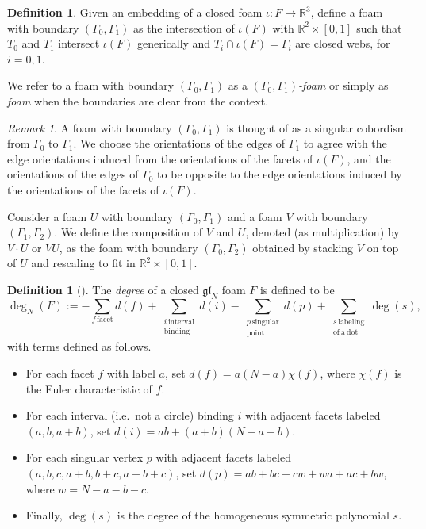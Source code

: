 \documentclass[12pt]{amsart}
\theoremstyle{definition}
\newtheorem{definition}[theorem]{Definition}
\theoremstyle{remark}
\newtheorem{remark}[theorem]{Remark}
\numberwithin{equation}{section}
\numberwithin{figure}{section}
\newcommand{\GL}{\mathfrak{gl}}
\newcommand{\foamdeg}{\deg_N}
\begin{document}
\begin{definition}\label{def:foam with closed boundary}
Given an embedding of a closed foam
$\iota : F \longrightarrow \mathbb{R}^3$, define a foam with boundary
$(\Gamma_0,\Gamma_1)$ as the intersection of $\iota(F)$ with
$\mathbb{R}^2 \times [0,1]$ such that $T_0$ and $T_1$ intersect
$\iota(F)$ generically and
$T_i \cap \iota(F)=\Gamma_i$ are closed webs, for $i=0,1$.
\end{definition}

We refer to a foam with boundary $(\Gamma_0,\Gamma_1)$ as a
\emph{$(\Gamma_0,\Gamma_1)$-foam} or simply as \emph{foam} when the boundaries are clear from the context.

\begin{remark}
A foam with boundary $(\Gamma_0,\Gamma_1)$ is thought of as a singular
cobordism from $\Gamma_0$ to $\Gamma_1$. We choose the orientations of the
edges of $\Gamma_1$ to agree with the edge orientations induced from the
orientations of the facets of $\iota(F)$, and the orientations of the edges
of $\Gamma_0$ to be opposite to the edge orientations induced by the
orientations of the facets of $\iota(F)$.

Consider a foam $U$ with boundary $(\Gamma_0,\Gamma_1)$ and a foam $V$ with
boundary $(\Gamma_1,\Gamma_2)$. We define the composition of $V$ and $U$,
denoted (as multiplication) by $V\cdot U$ or $V U$, as the foam with boundary $(\Gamma_0,\Gamma_2)$
obtained by stacking $V$ on top of $U$ and rescaling to fit in
$\mathbb{R}^2\times[0,1]$.
\end{remark}

\begin{definition}[{\cite[Definition 2.3]{RW2020}}]
\label{dfn:degreefoam}
The \emph{degree} of a closed $\GL_N$ foam $F$ is defined to be
\[
\foamdeg(F):=
-\sum_{f\,\mathrel{\mathrm{facet}}}d(f)
+\sum_{\substack{i\,\mathrel{\mathrm{interval}}\\
                   \mathrm{binding}}}d(i)
-\sum_{\substack{p\,\mathrel{\mathrm{singular}}\\
                   \mathrm{point}}}d(p)
+\sum_{\substack{s\,\mathrel{\mathrm{labeling}}\\
                   \mathrm{of\ a\ dot}}}\deg(s),
\]
with terms defined as follows.
\begin{itemize}
    \item For each facet $f$ with label $a$, set
    $d(f)=a(N-a)\chi(f)$, where $\chi(f)$ is the Euler characteristic of
    $f$.
    \item For each interval (i.e.\ not a circle) binding $i$ with adjacent
    facets labeled $(a,b,a+b)$, set
    $d(i)=ab+(a+b)(N-a-b)$.
    \item For each singular vertex $p$ with adjacent facets labeled
    $(a,b,c,a+b,b+c,a+b+c)$, set
    $d(p)=ab+bc+cw+wa+ac+bw$, where $w=N-a-b-c$.
    \item Finally, $\deg(s)$ is the degree of the homogeneous symmetric
    polynomial $s$.
\end{itemize}
\end{definition}
\end{document}

